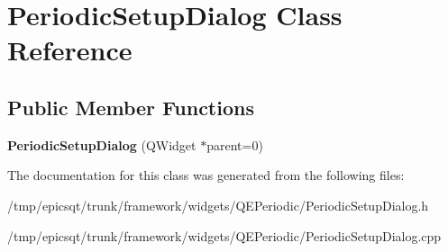 \hypertarget{classPeriodicSetupDialog}{
\section{PeriodicSetupDialog Class Reference}
\label{classPeriodicSetupDialog}
}
\subsection*{Public Member Functions}
\begin{DoxyCompactItemize}
\item 
\hypertarget{classPeriodicSetupDialog_a94edb9a86f6790d54813a8107617668f}{
{\bfseries PeriodicSetupDialog} (QWidget $\ast$parent=0)}
\label{classPeriodicSetupDialog_a94edb9a86f6790d54813a8107617668f}

\end{DoxyCompactItemize}


The documentation for this class was generated from the following files:\begin{DoxyCompactItemize}
\item 
/tmp/epicsqt/trunk/framework/widgets/QEPeriodic/PeriodicSetupDialog.h\item 
/tmp/epicsqt/trunk/framework/widgets/QEPeriodic/PeriodicSetupDialog.cpp\end{DoxyCompactItemize}

